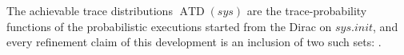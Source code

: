 \begin{definition}
  \label{def:achievable}
  \leanok
  The achievable trace distributions $\operatorname{ATD}(sys)$ are the trace-probability functions of the probabilistic executions started from the Dirac on $sys.init$, and every refinement claim of this development is an inclusion of two such sets: .
\end{definition}
